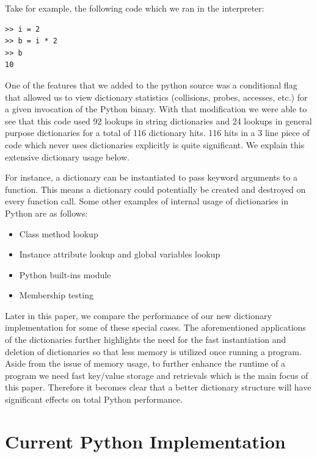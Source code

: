 \documentclass[12pt]{article}
\begin{document}
Take for example, the following code which we ran in the interpreter:

\begin{verbatim}
>> i = 2 
>> b = i * 2
>> b
10
\end{verbatim}

One of the features that we added to the python source was a conditional flag that allowed us to view dictionary statistics (collisions, probes, accesses, etc.) for a given invocation of the Python binary.  With that modification we were able to see that this code used 92 lookups in string dictionaries and 24 lookups in general purpose dictionaries for a total of 116 dictionary hits. 116 hits in a 3 line piece of code which never uses dictionaries explicitly is quite significant.  We explain this extensive dictionary usage below.

For instance, a dictionary can be instantiated to pass keyword arguments to a function. This means a dictionary could potentially be created and destroyed on every function call.  Some other examples of internal usage of dictionaries in Python are as follows:
\begin{itemize}
\item Class method lookup
\item Instance attribute lookup and global variables lookup
\item Python built-ins module
\item Membership testing
\end{itemize}

Later in this paper, we compare the performance of our new dictionary implementation for some of these special cases. The aforementioned applications of the dictionaries further highlights the need for the fast instantiation and deletion of dictionaries so that less memory is utilized once running a program. Aside from the issue of memory usage, to further enhance the runtime of a program we need fast key/value storage and retrievals which is the main focus of this paper. Therefore it becomes clear that a better dictionary structure will have significant effects on total Python performance.

\section{Current Python Implementation}
\end{document}
